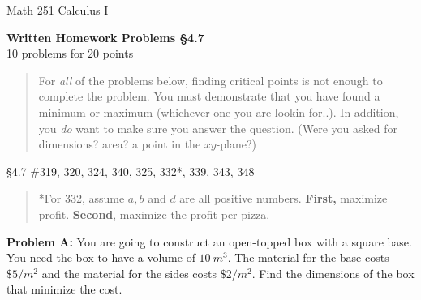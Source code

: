 \documentclass[11pt]{report}
\theoremstyle{plain}
\begin{document}
\hfill Math 251 Calculus I
\begin{center}
\Large{\textbf{Written Homework Problems \S 4.7}} \\
10 problems for 20 points\\
\end{center}


\begin{quote}For \emph{all} of the problems below, finding critical points is not enough to complete the problem. You must demonstrate that you have found a minimum or maximum (whichever one you are lookin for..). In addition, you \emph{do} want to make sure you answer the question. (Were you asked for dimensions? area? a point in the $xy$-plane?) \end{quote}

\noindent\S 4.7 \#319, 320, 324, 340, 325, 332*, 339, 343, 348 \\

\begin{quote}*For 332, assume $a,b$ and $d$ are all positive numbers. \textbf{First,} maximize profit. \textbf{Second}, maximize the profit per pizza. \end{quote}

\noindent\textbf{Problem A:} You are going to construct an open-topped box with a square base. You need the box to have a volume of $10 \: m^3.$ The material for the base costs $ \$ 5 / m^2$ and the material for the sides costs $\$ 2 / m^2.$ Find the dimensions of the box that minimize the cost.
\end{document}
